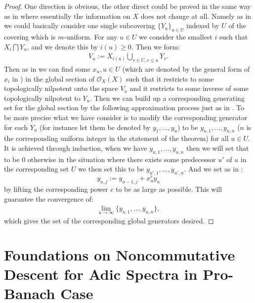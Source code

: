 \documentclass[12pt]{amsart}
\theoremstyle{definition}
\numberwithin{equation}{section}
\begin{document}
\begin{proof}
One direction is obvious, the other direct could be proved in the same way as in \cite[Proposition 2.6.17]{KL2} where essentially the information on $X$ does not change at all. Namely as in \cite[Proposition 2.6.17]{KL2} we could basically consider one single subcovering $\{Y_u\}_{u\in U}$ indexed by $U$ of the covering which is $m$-uniform. For any $u\in U$ we consider the smallest $i$ such that $X_i\bigcap Y_u$, and we denote this by $i(u)\geq 0$. Then we form:
\begin{align}
V_{u}:=X_{i(u)}\bigcup_{v\in U,v\leq u} Y_{v}.	
\end{align}
Then as in \cite[Proposition 2.6.17]{KL2} we can find some $x_u,u\in U$ (which are denoted by the general form of $x_i$ in \cite[Proposition 2.6.17]{KL2}) in the global section of $\mathcal{O}_X(X)$ such that it restricts to some topologically nilpotent onto the space $V_u$ and it restricts to some inverse of some topologically nilpotent to $Y_u$. Then we can build up a corresponding generating set for the global section by the following approximation process just as in \cite[Proposition 2.6.17]{KL2}. To be more precise what we have consider is to modify the corresponding generator for each $Y_u$ (for instance let them be denoted by $y_1,...,y_u$) to be $y_{u,1},...,y_{u,n}$ ($n$ is the corresponding uniform integer in the statement of the theorem) for all $u\in U$. It is achieved through induction, when we have $y_{u,1},...,y_{u,n}$ then we will set that to be $0$ otherwise in the situation where there exists some predecessor $u'$ of $u$ in the corresponding set $U$ we then set this to be $y_{u',1},...,y_{u',n}$. And we set as in \cite[Proposition 2.6.17]{KL2}:
\begin{displaymath}
y_{u,j}:=	y_{u-1,j}+x_u^cy_u
\end{displaymath}
by lifting the corresponding power $c$ to be as large as possible. This will guarantee the convergence of:
\begin{align}
\lim_{u\rightarrow \infty}\{y_{u,1},...,y_{u,n}\},	
\end{align}
which gives the set of the corresponding global generators desired.
\end{proof}


\newpage 


\section{Foundations on Noncommutative Descent for Adic Spectra in Pro-Banach Case}
\end{document}
